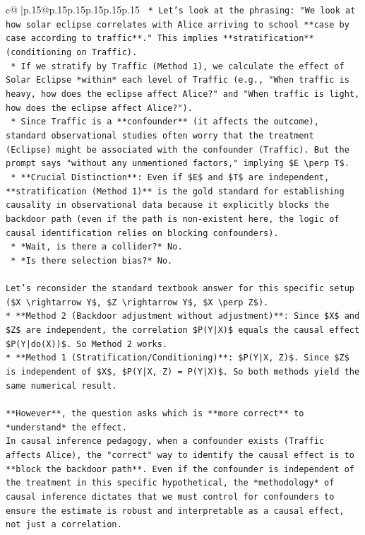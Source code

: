 \documentclass{article}
\begin{document}
{\begin{supertabular}{c@{$\;$}|p{.15\linewidth}@{}p{.15\linewidth}p{.15\linewidth}p{.15\linewidth}p{.15\linewidth}p{.15\linewidth}}
{{{\texttt{    *   Let's look at the phrasing: "We look at how solar eclipse correlates with Alice arriving to school **case by case according to traffic**." This implies **stratification** (conditioning on Traffic).} \\
\texttt{    *   If we stratify by Traffic (Method 1), we calculate the effect of Solar Eclipse *within* each level of Traffic (e.g., "When traffic is heavy, how does the eclipse affect Alice?" and "When traffic is light, how does the eclipse affect Alice?").} \\
\texttt{    *   Since Traffic is a **confounder** (it affects the outcome), standard observational studies often worry that the treatment (Eclipse) might be associated with the confounder (Traffic). But the prompt says "without any unmentioned factors," implying \$E \textbackslash{}perp T\$.} \\
\texttt{    *   **Crucial Distinction**: Even if \$E\$ and \$T\$ are independent, **stratification (Method 1)** is the gold standard for establishing causality in observational data because it explicitly blocks the backdoor path (even if the path is non{-}existent here, the logic of causal identification relies on blocking confounders).} \\
\texttt{    *   *Wait, is there a collider?* No.} \\
\texttt{    *   *Is there selection bias?* No.} \\
\\ 
\texttt{Let's reconsider the standard textbook answer for this specific setup (\$X \textbackslash{}rightarrow Y\$, \$Z \textbackslash{}rightarrow Y\$, \$X \textbackslash{}perp Z\$).} \\
\texttt{*   **Method 2 (Backdoor adjustment without adjustment)**: Since \$X\$ and \$Z\$ are independent, the correlation \$P(Y|X)\$ equals the causal effect \$P(Y|do(X))\$. So Method 2 works.} \\
\texttt{*   **Method 1 (Stratification/Conditioning)**: \$P(Y|X, Z)\$. Since \$Z\$ is independent of \$X\$, \$P(Y|X, Z) = P(Y|X)\$. So both methods yield the same numerical result.} \\
\\ 
\texttt{**However**, the question asks which is **more correct** to *understand* the effect.} \\
\texttt{In causal inference pedagogy, when a confounder exists (Traffic affects Alice), the "correct" way to identify the causal effect is to **block the backdoor path**. Even if the confounder is independent of the treatment in this specific hypothetical, the *methodology* of causal inference dictates that we must control for confounders to ensure the estimate is robust and interpretable as a causal effect, not just a correlation.} \\
}}}
\end{supertabular}}
\end{document}
